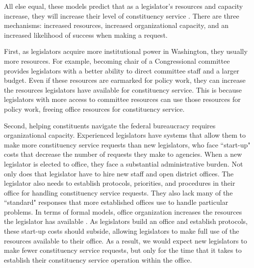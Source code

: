 \documentclass[12pt]{article}
\begin{document}

All else equal, these models predict that as a legislator's resources and capacity increase, they will increase their level of constituency service \cite[Proposition 1]{AshworthBuenodeMesquita2006}. There are three mechanisms: increased resources, increased organizational capacity, and an increased likelihood of success when making a request. 

First, as legislators acquire more institutional power in Washington, they usually more resources. For example, becoming chair of a Congressional committee provides legislators with a better ability to direct committee staff and a larger budget. Even if these resources are earmarked for policy work, they can increase the resources legislators have available for constituency service. This is because legislators with more access to committee resources can use those resources for policy work, freeing office resources for constituency service. 




Second, helping constituents navigate the federal bureaucracy requires organizational capacity. Experienced legislators have systems that allow them to make more constituency service requests than new legislators, who face ``start-up" costs that decrease the number of requests they make to agencies. When a new legislator is elected to office, they face a substantial administrative burden. Not only does that legislator have to hire new staff and open district offices. The legislator also needs to establish protocols, priorities, and procedures in their office for handling constituency service requests. They also lack many of the ``standard" responses that more established offices use to handle particular problems. In terms of formal models, office organization increases the resources the legislator has available \citep{AshworthBuenodeMesquita2006}. As legislators build an office and establish protocols, these start-up costs should subside, allowing legislators to make full use of the resources available to their office. As a result, we would expect new legislators to make fewer constituency service requests, but only for the time that it takes to establish their constituency service operation within the office.   
\end{document}
